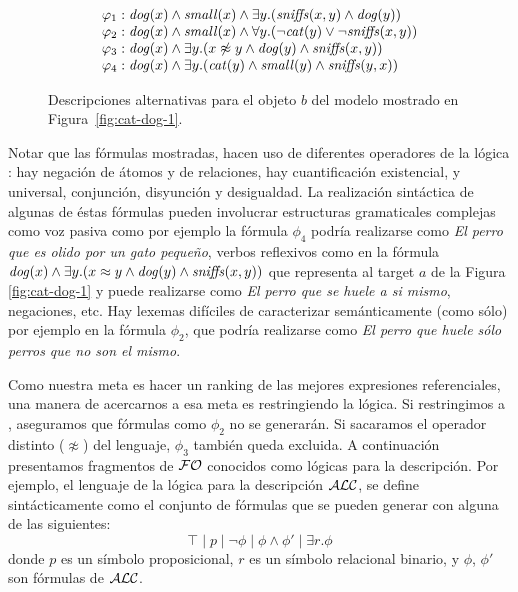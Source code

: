 \begin{figure}[h]
$$
\begin{array}{ll}
 \varphi_1:  \mathit{dog}(x) \land \mathit{small}(x) \land
   \exists y . (\mathit{sniffs}(x,y) \land \mathit{dog}(y))\\
  \varphi_2:  \mathit{dog}(x) \land \mathit{small}(x) \land
  \forall y . (\neg \mathit{cat}(y) \lor \neg \mathit{sniffs}(x,y))\\
  \varphi_3:  \mathit{dog}(x) \land
  \exists y . (x \not\approx y \land \mathit{dog}(y)  \land \mathit{sniffs}(x,y))\\
  \varphi_4:  \mathit{dog}(x) \land
  \exists y . (\mathit{cat}(y) \land \mathit{small}(y) \land \mathit{sniffs}(y,x))
 \end{array}
$$
\caption{Descripciones alternativas para el objeto $b$ del modelo mostrado en Figura~\protect\ref{fig:cat-dog-1}.}\label{tab:gammas}
\end{figure}

Notar que las f\'ormulas mostradas, hacen uso de diferentes operadores de la l\'ogica \FOL: hay negaci\'on de \'atomos y de relaciones, hay cuantificaci\'on existencial, y universal, conjunci\'on, disyunci\'on y desigualdad. La realizaci\'on sint\'actica de algunas de \'estas f\'ormulas pueden involucrar estructuras gramaticales complejas como voz pasiva como por ejemplo la f\'ormula $\phi_4$ podr\'ia realizarse como {\it El perro que es olido por un gato peque\~no}, verbos reflexivos como en la f\'ormula $\mathit{dog}(x) \land \exists y . (x \approx y \land \mathit{dog}(y) \land \mathit{sniffs}(x,y))$ que representa al target $a$ de la Figura \ref{fig:cat-dog-1} y puede realizarse como {\it El perro que se huele a si mismo}, negaciones, etc. Hay lexemas dif\'iciles de caracterizar sem\'anticamente (como s\'olo) por ejemplo en la f\'ormula $\phi_2$, que podr\'ia realizarse como {\it El perro que huele s\'olo perros que no son el mismo}.
 
Como nuestra meta es hacer un ranking de las mejores expresiones referenciales, una manera de acercarnos a esa meta es restringiendo la l\'ogica. Si restringimos a \EPFOL, aseguramos que f\'ormulas como $\phi_2$ no se generar\'an. Si sacaramos el operador distinto ($\not\approx$) del lenguaje, $\phi_3$ tambi\'en queda excluida.
A continuaci\'on presentamos fragmentos de $\mathcal{FO}$ conocidos como l\'ogicas para la descripci\'on. Por ejemplo, el lenguaje de la l\'ogica para la descripci\'on $\mathcal{ALC}$, se define sint\'acticamente como el conjunto de f\'ormulas que se pueden generar con alguna de las siguientes:
$$
\top \mid p \mid \neg \phi \mid \phi \wedge \phi' \mid  \exists r. \phi
$$
donde $p$ es un s\'imbolo proposicional, $r$ es un s\'imbolo relacional binario, y $\phi$, $\phi'$ son f\'ormulas de $\mathcal{ALC}$.

